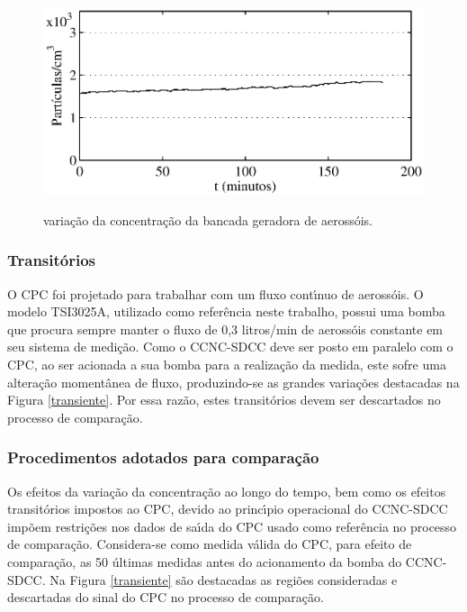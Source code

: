 \begin{figure}[hbt]
\begin{center}
\includegraphics[scale=1.0]{GraficosMatlab/concvar.eps}\\
\end{center}
\caption{\label{concvar}\hspace{-0.1em} varia\c{c}\~{a}o da concentra\c{c}\~{a}o da bancada geradora de aeross\'{o}is.}
\end{figure}



\subsubsection {Transit\'{o}rios}
O CPC foi projetado para trabalhar com um fluxo cont\'{\i}nuo de aeross\'{o}is. O modelo TSI3025A, utilizado como refer\^{e}ncia neste trabalho, possui uma bomba que procura sempre manter o fluxo de 0,3 litros/min de aeross\'{o}is constante em seu sistema de medi\c{c}\~{a}o. Como o CCNC-SDCC deve ser posto em paralelo com o CPC, ao ser acionada a sua bomba para a realiza\c{c}\~{a}o da medida, este sofre uma altera\c{c}\~{a}o moment\^{a}nea de fluxo, produzindo-se as grandes varia\c{c}\~{o}es destacadas na Figura \ref{transiente}. Por essa raz\~{a}o, estes transit\'{o}rios devem ser descartados no processo de compara\c{c}\~{a}o.

\subsubsection{Procedimentos adotados para compara\c{c}\~{a}o}
Os efeitos da varia\c{c}\~{a}o da concentra\c{c}\~{a}o ao longo do tempo, bem como os efeitos transit\'{o}rios impostos ao CPC, devido ao princ\'{\i}pio operacional do CCNC-SDCC imp\~{o}em restri\c{c}\~{o}es nos dados de sa\'{\i}da do CPC usado como refer\^{e}ncia no processo de compara\c{c}\~{a}o. Considera-se como medida v\'{a}lida do CPC, para efeito de compara\c{c}\~{a}o, as 50 \'{u}ltimas medidas antes do acionamento da bomba do CCNC-SDCC. Na Figura \ref{transiente} s\~{a}o destacadas as regi\~{o}es consideradas e descartadas do sinal do CPC no processo de compara\c{c}\~{a}o.

